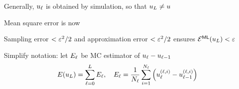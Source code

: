\begin{frame}{\name{}}
    \begin{overlayarea}{\textwidth}{\frameheight}
        \vspace{2em}%
        \begin{squarelist}
            \item<1-> Generally, $u_\ell$ is obtained by simulation, so that $u_L \neq u$
            \item<2-> Mean square error is now
            \item<6-> Sampling error $< \varepsilon^2/2$ and approximation error $< \varepsilon^2/2$ ensures $\mathcal{E}^{\mathsf{ML}}(u_L) < \varepsilon$
            \item<7-> Simplify notation: let $E_\ell$ be MC estimator of $u_\ell - u_{\ell-1}$
                \begin{equation*}
                    E(u_L) = \sum_{\ell = 0}^L E_\ell, \quad E_\ell = \frac{1}{N_\ell}\sum_{i=1}^{N_\ell}\left(u_\ell^{(\ell,i)} - u_{\ell-1}^{(\ell,i)}\right)
                \end{equation*}
        \end{squarelist}
    \end{overlayarea}
\end{frame}

